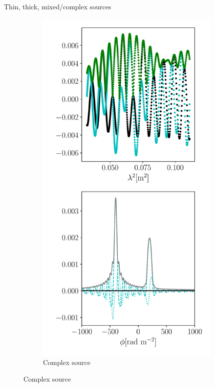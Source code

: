 \documentclass[xetex,aspectratio=169]{beamer}
\begin{document}
\begin{frame}{Thin, thick, mixed/complex sources}
\begin{figure}
\begin{subfigure}{0.2\textwidth}
		\end{subfigure}
		\begin{subfigure}{0.2\textwidth}
			\includegraphics[width=\textwidth]{figures/sources/mixed_source.pdf}
			\caption{Complex source}
		\end{subfigure}
	\end{figure}

\end{frame}
\end{document}
